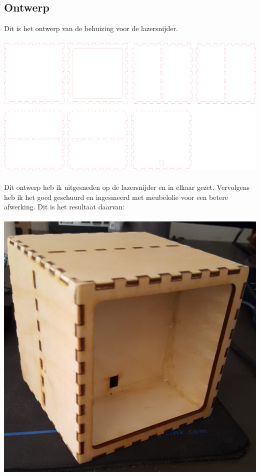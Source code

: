 \documentclass[a4paper,12pt]{article}
\begin{document}
\subsection{Ontwerp}
Dit is het ontwerp van de behuizing voor de lazersnijder.
\\ \\
\includegraphics[scale=0.4]{klok}
\\ \\
Dit ontwerp heb ik uitgesneden op de lazersnijder en in elkaar gezet.
Vervolgens heb ik het goed geschuurd en ingesmeerd met meubelolie voor een betere afwerking.
Dit is het resultaat daarvan: 
\\ \\
\includegraphics[scale=0.2]{case}
\end{document}
